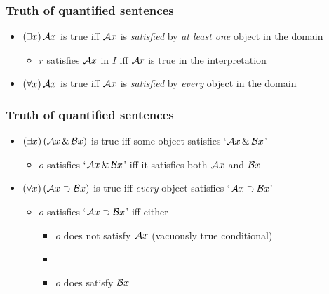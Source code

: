 \begin{frame}
  \frametitle{Truth of quantified sentences}

  \begin{itemize}[<+->]
    \item $(\exists x)\,\mathcal{A}x$ is true iff $\mathcal{A}x$ is \emph{satisfied} by \emph{at least one} object in the domain
    \begin{itemize}
    \item $r$ satisfies $\mathcal{A}x$ in $I$ iff $\mathcal{A}r$ is true in the interpretation 
    \end{itemize}
    \bigskip
    
    \item $(\forall x)\,\mathcal{A}x$ is true iff $\mathcal{A}x$ is \emph{satisfied} by \emph{every} object in the domain
  \end{itemize}
\end{frame}

\begin{frame}
  \frametitle{Truth of quantified sentences}
\large 
  \begin{itemize}[<+->]
    \item $(\exists x)\,(\mathcal{A}x \,\&\, \mathcal{B}x)$ is true iff \textcolor{OGlyallpink}{some} object satisfies `$\mathcal{A}x \,\&\, \mathcal{B}x$'
    \begin{itemize}
      \item $o$ satisfies `$\mathcal{A}x \,\&\, \mathcal{B}x$' iff it satisfies both $\mathcal{A}x$ and $\mathcal{B}x$
    \end{itemize}
    
\bigskip

    \item $(\forall x)\,(\mathcal{A}x \supset \mathcal{B}x)$ is true iff \emph{every} object satisfies `$\mathcal{A}x \supset \mathcal{B}x$'
    \medskip
    \begin{itemize} 
    \large 
      \item $o$ satisfies `$\mathcal{A}x \supset \mathcal{B}x$' iff
      either
      \bigskip
      \begin{itemize}  
      \normalsize
        \item $o$ does not satisfy $\mathcal{A}x$ (vacuously true conditional)
        \item[] 
        \item $o$ does satisfy $\mathcal{B}x$
      \end{itemize}
       \bigskip
    \end{itemize}
  \end{itemize}
\end{frame}


